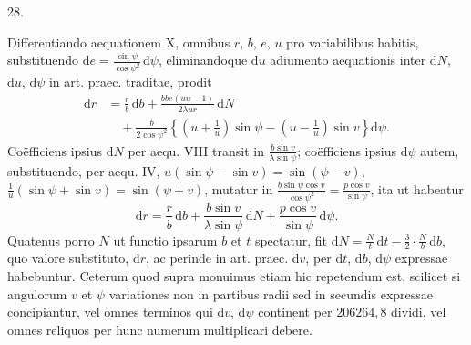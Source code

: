 \begin{center}
\hypertarget{native-044-article028}{}28.
\end{center}
Differentiando aequationem X, omnibus $r$, $b$, $e$, $u$ pro variabilibus habitis, substituendo $\mathrm{d}e=\frac{\sin\psi}{\cos\psi^2}\,\mathrm{d}\psi$, eliminandoque $\mathrm{d}u$ adiumento aequationis inter $\mathrm{d}N$, $\mathrm{d}u$, $\mathrm{d}\psi$ in art. praec. traditae, prodit
\[
\begin{aligned}
\mathrm{d}r&=\frac{r}{b}\,\mathrm{d}b+\frac{bbe(uu-1)}{2\lambda ur}\,\mathrm{d}N\\
&\quad+\frac{b}{2\cos\psi^2}\left\{\left(u+\frac{1}{u}\right)\sin\psi-\left(u-\frac{1}{u}\right)\sin v\right\}\mathrm{d}\psi.
\end{aligned}
\]
Coëfficiens ipsius $\mathrm{d}N$ per aequ. VIII transit in $\frac{b\sin v}{\lambda\sin\psi}$; coëfficiens ipsius $\mathrm{d}\psi$ autem, substituendo, per aequ. IV, $u(\sin\psi-\sin v)=\sin(\psi-v)$, $\frac{1}{u}(\sin\psi+\sin v)=\sin(\psi+v)$, mutatur in $\frac{b\sin\psi\cos v}{\cos\psi^2}=\frac{p\cos v}{\sin\psi}$, ita ut habeatur
\[
\mathrm{d}r=\frac{r}{b}\,\mathrm{d}b+\frac{b\sin v}{\lambda\sin\psi}\,\mathrm{d}N+\frac{p\cos v}{\sin\psi}\,\mathrm{d}\psi.
\]
Quatenus porro $N$ ut functio ipsarum $b$ et $t$ spectatur, fit $\mathrm{d}N=\frac{N}{t}\,\mathrm{d}t-\frac{3}{2}\cdot\frac{N}{b}\,\mathrm{d}b$, quo valore substituto, $\mathrm{d}r$, ac perinde in art. praec. $\mathrm{d}v$, per $\mathrm{d}t$, $\mathrm{d}b$, $\mathrm{d}\psi$ expressae habebuntur. Ceterum quod supra monuimus etiam hic repetendum est, scilicet si angulorum $v$ et $\psi$ variationes non in partibus radii sed in secundis expressae concipiantur, vel omnes terminos qui $\mathrm{d}v$, $\mathrm{d}\psi$ continent per $206264{,}8$ dividi, vel omnes reliquos per hunc numerum multiplicari debere.
